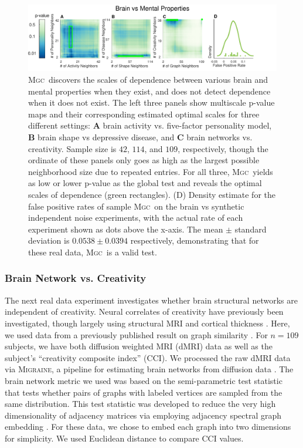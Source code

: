 \documentclass[11pt]{article}
\providecommand{\sct}[1]{{\normalfont\textsc{#1}}}
\newcommand{\Migraine}{\sct{Migraine}}
\newcommand{\Mgc}{\sct{Mgc}}
\begin{document}
\begin{figure}[htbp]
\includegraphics[width=1.0\textwidth]{Figures/FigReal}
\caption{\Mgc~discovers the scales of dependence between various brain and mental properties when they exist, and does not detect dependence when it does not exist.  The left three panels show multiscale p-value maps and their corresponding estimated optimal scales for three different settings: \textbf{A}  brain activity vs. five-factor personality model, \textbf{B}  brain shape vs depressive disease, and \textbf{C} brain networks vs. creativity. Sample size is $42$, $114$, and $109$, respectively, though the ordinate of these panels only goes as high as the largest possible neighborhood size due to repeated entries.  
For all three, \Mgc~yields as low or lower p-value as the global test and reveals the optimal scales of dependence (green rectangles).
(D) Density estimate for the false positive rates of sample \Mgc~on the brain vs synthetic independent noise experiments, with the actual rate of each experiment shown as dots above the x-axis. The mean $\pm$ standard deviation is $0.0538 \pm 0.0394$ respectively, demonstrating that for these real data, \Mgc~is  a valid test.}
\label{f:real}
\end{figure}

\subsubsection*{Brain Network vs. Creativity}

The next real data experiment investigates whether brain structural networks are independent of creativity.  Neural correlates of creativity have previously been investigated, though largely using structural MRI and cortical thickness \cite{Jung2009}.  Here, we used data from a previously published result on graph similarity \cite{Koutra15a}. For  $n=109$ subjects, we have both diffusion weighted MRI (dMRI) data as well as the subject's ``creativity composite index'' (CCI).  We processed the raw dMRI data via \Migraine, a pipeline for estimating brain networks from diffusion data \cite{GrayRoncal2013}.   
The brain network metric we used was based on  the semi-parametric test statistic \cite{Tang2016} that tests whether pairs of graphs with labeled vertices are sampled from the same distribution.  This test statistic was developed to reduce  the very high dimensionality of adjacency matrices via employing adjacency spectral graph embedding  \cite{Sussman2013}. For these data, we chose to embed each graph into two dimensions for simplicity. We used Euclidean distance to compare CCI values. 
\end{document}
